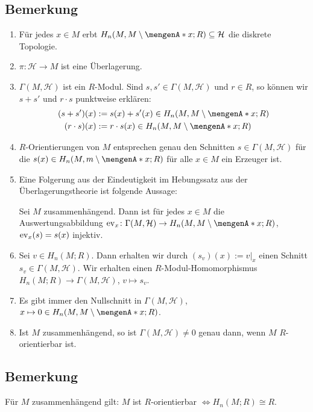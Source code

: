 \subsection{Bemerkung} %
\label{sub:1611}
\begin{enumerate}[1)]
	\item Für jedes $x \in M$ erbt $H_n(M,M \setminus \set{x};R) \subseteq \mathcal{H}$ die diskrete Topologie.
	\item $\pi \colon \mathcal{H} \to M$ ist eine Überlagerung.
	\item $\Gamma(M,\mathcal{H})$ ist ein $R$-Modul. Sind $s,s' \in \Gamma(M,\mathcal{H})$ und $r \in R$, so können wir $s+s'$ und $r \cdot s$ punktweise erklären:
	\begin{align*}
		(s+s') (x) &:= s(x) + s'(x) \in H_n(M,M \setminus \set{x};R )\\
		(r \cdot s) (x) &:= r \cdot s(x) \in H_n(M,M \setminus \set{x};R )
	\end{align*}
	\item $R$-Orientierungen von $M$ entsprechen genau den Schnitten $s \in \Gamma(M,\mathcal{H})$ für die $s(x) \in H_n(M,m \setminus \set{x};R)$ für alle $x \in M$ ein 
	Erzeuger ist.
	\item Eine Folgerung aus der Eindeutigkeit im Hebungssatz aus der Überlagerungstheorie ist folgende Aussage:
	
	Sei $M$ zusammenhängend. Dann ist für jedes $x \in M$ die Auswertungsabbildung $\ev_x\colon \Gamma(M,\mathcal{H}) \to H_n(M,M \setminus \set{x};R)$, $\operatorname{ev}_x(s)=s(x)$
	injektiv.
	\item Sei $v \in H_n(M;R)$. Dann erhalten wir durch $(s_v)(x) := v|_x$ einen Schnitt $s_v\in \Gamma(M,\mathcal{H})$. Wir erhalten einen $R$-Modul-Homomorphismus
	$H_n(M;R) \to \Gamma(M,\mathcal{H})$, $v \mapsto s_v$.
	\item Es gibt immer den Nullschnitt in $\Gamma(M,\mathcal{H})$, $x \mapsto 0\in H_n(M,M\setminus \set{x};R)$.
	\item Ist $M$ zusammenhängend, so ist $\Gamma(M,\mathcal{H})\not=0$ genau dann, wenn $M$ $R$-orientierbar ist.
\end{enumerate}

\subsection{Bemerkung} %
\label{sub:1612}
Für $M$ zusammenhängend gilt: $M$ ist $R$-orientierbar $\iff H_n(M;R) \cong R$. 

